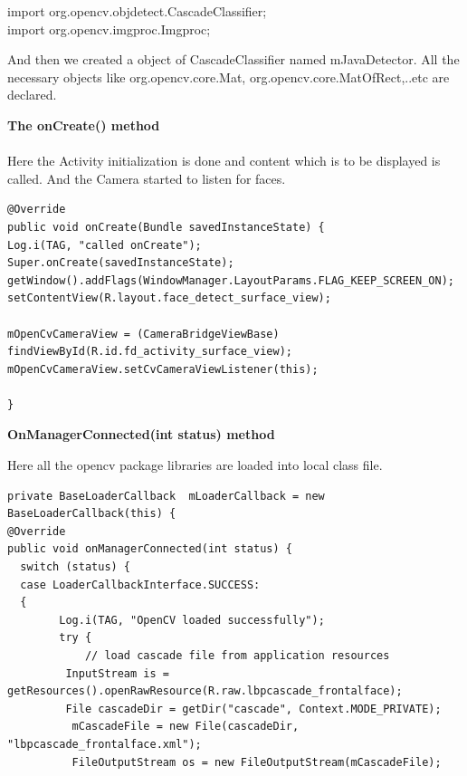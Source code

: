 \documentclass[11pt,a4paper,twoside]{report}
\begin{document}
\begin{appendix}
\begin{flushleft}
import org.opencv.objdetect.CascadeClassifier;\\
import org.opencv.imgproc.Imgproc;\\

\vspace{.3cm}

And then we created a object of CascadeClassifier    named mJavaDetector.
All the necessary objects like org.opencv.core.Mat, org.opencv.core.MatOfRect,..etc are declared.

\vspace{.4cm}
\textbf{
The onCreate() method
}
\end{flushleft}

\paragraph{ }Here the Activity initialization is done and content which is to be displayed is called. And the Camera started to listen for faces.

\begin{small}

\begin{lstlisting}
@Override
public void onCreate(Bundle savedInstanceState) {
Log.i(TAG, "called onCreate");
Super.onCreate(savedInstanceState);
getWindow().addFlags(WindowManager.LayoutParams.FLAG_KEEP_SCREEN_ON);
setContentView(R.layout.face_detect_surface_view);

mOpenCvCameraView = (CameraBridgeViewBase) findViewById(R.id.fd_activity_surface_view);
mOpenCvCameraView.setCvCameraViewListener(this);

}
\end{lstlisting}


\end{small}

\vspace{.3cm}
\begin{flushleft}
\textbf{OnManagerConnected(int status) method}\\

\end{flushleft}

Here all the opencv package libraries are loaded into local class file.
\begin{flushleft}
\begin{small}
\begin{lstlisting}
private BaseLoaderCallback  mLoaderCallback = new BaseLoaderCallback(this) {
@Override
public void onManagerConnected(int status) {
  switch (status) {
  case LoaderCallbackInterface.SUCCESS:
  {
        Log.i(TAG, "OpenCV loaded successfully");
        try {
            // load cascade file from application resources
         InputStream is = getResources().openRawResource(R.raw.lbpcascade_frontalface);
         File cascadeDir = getDir("cascade", Context.MODE_PRIVATE);
          mCascadeFile = new File(cascadeDir, "lbpcascade_frontalface.xml");
          FileOutputStream os = new FileOutputStream(mCascadeFile);


\end{lstlisting}
\end{small}
\end{flushleft}
\end{appendix}
\end{document}
